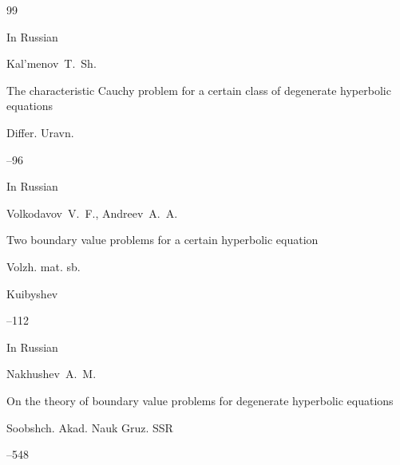 




\EngRef



\begin{thebibliography}{99}




\lang In Russian

\by Kal'menov~T.~Sh.

\paper The characteristic Cauchy problem for a certain class of degenerate hyperbolic equations

\jour Differ. Uravn.




--96







\lang In Russian

\by Volkodavov~V.~F., Andreev~A.~A.

\paper Two boundary value problems for a certain hyperbolic equation

\serial Volzh. mat. sb. 

\publaddr Kuibyshev



--112







\lang In Russian

\by Nakhushev~A.~M.

\paper On the theory of boundary value problems for degenerate hyperbolic equations


\jour Soobshch. Akad. Nauk Gruz. SSR 


--548 


\end{thebibliography}
